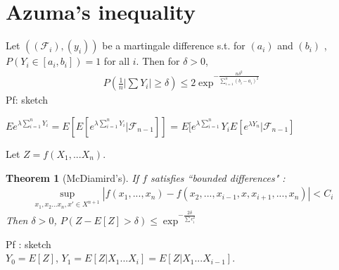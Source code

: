 \documentclass[10pt]{article}
\newcounter{lecnum}
\newtheorem{theorem}{Theorem}[lecnum]
\begin{document}
\section{Azuma's inequality}
Let $((\mathscr{F}_{i}), (y_{i}))$ be a martingale difference s.t. for $(a_{i})$ and $(b_{i})$ , $P(Y_{i} \in [a_{i}, b_{i}]) = 1 $ for all $i$. Then for $\delta > 0$, 
\begin{align*}
P(\frac{1}{n}|\sum Y_{i}| \ge \delta) \le 2\exp^{-\frac{n\delta^{2}}{\sum\limits_{i=1}^{n}(b_{i}-a_{i})^{2}  }}
\end{align*}
Pf: sketch \par
$Ee^{\lambda \sum\limits_{i=1}^{n}Y_{i}} = E[E[e^{\lambda\sum\limits_{i=1}^{n}Y_{i}}|\mathscr{F}_{n-1}]] $
= $ E[e^{\lambda \sum\limits_{i=1}^{n}} Y_{i}E[e^{ \lambda Y_{n} } | \mathscr{F}_{n-1}] $ \\
\par
Let $Z = f(X_{1},...X_{n})$.
\begin{theorem}[McDiamird's]
If $f$ satisfies ``bounded differences" : \\
\begin{align*}
\sup\limits_{x_{1},x_{2}...x_{n},x'\in X^{n+1}}|f(x_{1},...,x_{n}) - f(x_{2},..., x_{i-1},x, x_{i+1},...,x_{n})| < C_{i}
\end{align*}
Then $\delta > 0$, $P(Z - E[Z] > \delta) \le \exp^{-\frac{2\delta}{\sum c_{i}^{2}}}$
\end{theorem}
Pf : sketch \\
$Y_{0} = E[Z]$, $Y_{1} = E[Z|X_{1}...X_{i}] = E[Z|X_{1}...X_{i-1}]$.


\end{document}
